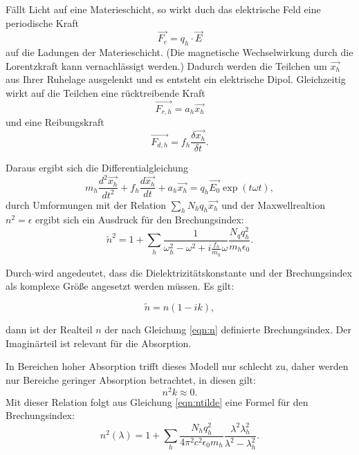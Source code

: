 Fällt Licht auf eine Materieschicht, so wirkt duch das elektrische Feld eine
periodische Kraft
\begin{equation}
  \vec{F_e}=q_h\cdot \vec{E}
\end{equation}
auf die Ladungen der Materieschicht. (Die magnetische Wechselwirkung durch
die Lorentzkraft kann vernachlässigt werden.)
Dadurch werden die Teilchen um $\vec{x_h}$ aus Ihrer Ruhelage ausgelenkt und es entsteht
ein elektrische Dipol.
Gleichzeitig wirkt auf die Teilchen eine rücktreibende Kraft
\begin{equation}
  \vec{F_{r,h}}=a_h \vec{x_h}
\end{equation}
und eine Reibungskraft
\begin{equation}
  \vec{F_{d,h}}=f_h \frac{\delta \vec{x_h}}{\delta t}.
\end{equation}

Daraus ergibt sich die Differentialgleichung
\begin{equation}
  m_h\frac{d^{2}\vec{x_h}}{dt^{2}}+f_h\frac{d\vec{x_h}}{dt}+a_h\vec{x_h}=q_h\vec{E_0}\exp{(t\omega t)},
\end{equation}
durch Umformungen mit der Relation $\sum_{h}{N_h q_h \vec{x_h}}$ und der
Maxwellrealtion $n^{2}=\epsilon$ ergibt sich
ein Ausdruck für den Brechungsindex:
\begin{equation}
  \tilde{n}^2=1+ \sum_{h} \frac{1}{\omega^{2}_h - \omega^{2}+i\frac{f_h}{m_h}\omega}
  \frac{N_q q^{2}_h}{m_h \epsilon_0}.
  \label{eqn:ntilde}
\end{equation}

Durch $\tilde{}$\;wird angedeutet, dass die Dielektrizitätskonstante und der
Brechungsindex als komplexe Größe angesetzt werden müssen. Es gilt:

\begin{equation}
  \tilde{n}= n(1-ik),
\end{equation}

dann ist der Realteil $n$ der nach Gleichung \ref{eqn:n} definierte Brechungsindex.
Der Imaginärteil ist relevant für die Absorption.

In Bereichen hoher Absorption trifft dieses Modell nur schlecht zu, daher
werden nur Bereiche geringer Absorption betrachtet, in diesen gilt:
\begin{equation}
  n^{2}k\approx 0.
\end{equation}
 Mit dieser Relation folgt aus Gleichung \ref{eqn:ntilde} eine Formel für den
 Brechungsindex:
 \begin{equation}
   n^{2}(\lambda)= 1+ \sum_{h}\frac{N_h q^{2}_h}{4\pi^{2}c^2 \epsilon_0 m_h}
   \frac{\lambda^2 \lambda^{2}_h}{\lambda^2 - \lambda^{2}_h}.
   \label{eqn:nquadrat}
 \end{equation}


